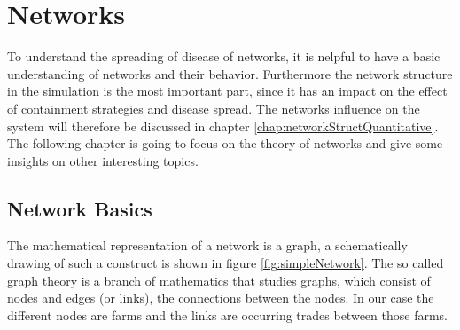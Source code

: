 \section{Networks}\label{chap:networksBasics}
To understand the spreading of disease of networks, it is nelpful to have a basic understanding of networks and their behavior. Furthermore the network structure in the simulation is the most important part, since it has an impact on the effect of containment strategies and disease spread. The networks influence on the system will therefore be discussed in chapter \ref{chap:networkStructQuantitative}. The following chapter is going to focus on the theory of networks and give some insights on other interesting topics.
\subsection{Network Basics}
The mathematical representation of a network is a graph, a schematically drawing of such a construct is shown in figure \ref{fig:simpleNetwork}. The so called graph theory is a branch of mathematics that studies graphs, which consist of nodes and edges (or links), the connections between the nodes. In our case the different nodes are farms and the links are occurring trades between those farms.
